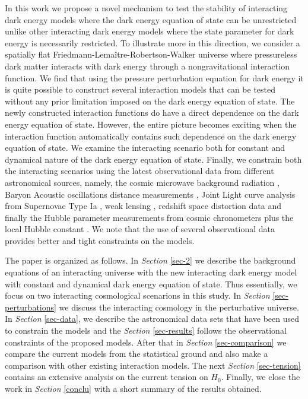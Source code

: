 \documentclass[superscriptaddress,oneolumn,secnumarabic,
amssymb,amsmath,nobibnotes,aps,prd,showpacs,nofootinbib]{revtex4}%
\begin{document}
In this work we propose a novel mechanism to test the stability of interacting dark energy models where the dark energy equation of state can be unrestricted unlike other interacting dark energy models where the state parameter for dark energy is necessarily restricted. To illustrate more in this direction, we consider a spatially flat Friedmann-Lema\^itre-Robertson-Walker universe where pressureless dark matter interacts with dark energy through a nongravitational interaction function. We find that using the pressure perturbation equation for dark energy it is quite possible to construct several interaction models that can be tested without any prior limitation imposed on the dark energy equation of state. The newly constructed interaction functions do have a direct dependence on the dark energy equation of state. However, the entire picture becomes exciting when the interaction function automatically contains such dependence on the dark energy equation of state. We examine the interacting scenario both for constant and dynamical nature of the dark energy equation of state. Finally, we constrain both the interacting scenarios using the latest observational data from different astronomical sources, namely, the cosmic microwave background radiation \cite{ref:Planck2015-1, ref:Planck2015-2}, Baryon Acoustic oscillations distance measurements \cite{Beutler:2011hx,Padmanabhan:2012hf, Manera:2012sc}, Joint Light curve analysis from Supernovae Type Ia \cite{Betoule:2014frx}, weak lensing \cite{Heymans:2013fya,Asgari:2016xuw}, redshift space distortion data \cite{Percival:2004fs,Blake:2011rj,Samushia:2011cs,Reid:2012sw,Beutler:2012px,delaTorre:2013rpa} and finally the Hubble parameter measurements from cosmic chronometers \cite{Moresco:2016mzx} plus the local Hubble constant \cite{Riess:2016jrr}. We note that the use of several observational data provides better and tight constraints on the models.



The paper is organized as follows. In \textit{Section} \ref{sec-2} we describe the background equations of an interacting universe with the new interacting dark energy model with constant and dynamical dark energy equation of state. Thus essentially, we focus on two interacting cosmological scenarions in this study. In \textit{Section} \ref{sec-perturbations} we discuss the interacting cosmology in the perturbative universe. In \textit{Section} \ref{sec-data}, we describe the astronomical data sets that have been used to constrain the models and the \textit{Section} \ref{sec-results} follows the observational constraints of the proposed models. After that in \textit{Section} \ref{sec-comparison} we compare the current models from the statistical ground and also make a comparison with other existing interaction models. The next \textit{Section} \ref{sec-tension} contains an extensive analysis on the current tension on $H_0$. Finally, we close the work in \textit{Section} \ref{conclu} with a short summary of the results obtained.
\end{document}
